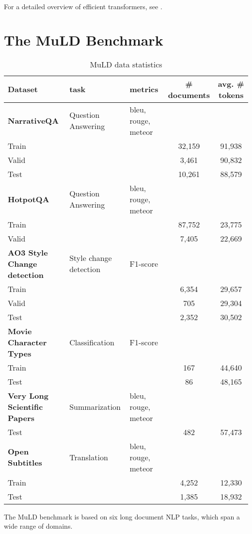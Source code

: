 \documentclass[10pt, a4paper]{article}
\begin{document}
For a detailed overview of efficient transformers, see .

\section{The MuLD Benchmark}

\begin{table*}[]
    \centering
    \begin{tabular}{lllcc}
    \toprule
    Dataset     & task & metrics &  \# documents & avg. \# tokens 
\\
    \midrule

    \textbf{NarrativeQA} & Question Answering & bleu, rouge, meteor & \\ 
    Train & & & 32,159 & 91,938\\
    Valid & &  & 3,461 & 90,832\\
    Test & &  & 10,261 & 88,579\\
    \textbf{HotpotQA} & Question Answering & bleu, rouge, meteor & \\
    Train & & & 87,752 & 23,775\\
    Valid & & & 7,405 & 22,669\\
    \textbf{AO3 Style Change detection} & Style change detection & F1-score & \\
    Train & & & 6,354 & 29,657\\
    Valid & & & 705 & 29,304\\
    Test & &  & 2,352 & 30,502 \\
    \textbf{Movie Character Types} & Classification & F1-score\\
    Train & & & 167 & 44,640\\
    Test & & & 86 & 48,165\\
    \textbf{Very Long Scientific Papers} & Summarization & bleu, rouge, meteor\\
    Test & & & 482 & 57,473\\
    \textbf{Open Subtitles} & Translation & bleu, rouge, meteor\\
    Train & & & 4,252 & 12,330\\
    Test & & & 1,385 & 18,932\\
    \bottomrule
    \end{tabular}
    \caption{MuLD data statistics}
    \label{tab:dataset_summary}
\end{table*}
The MuLD benchmark is based on six long document NLP tasks, which span a wide range of domains. 
\end{document}
